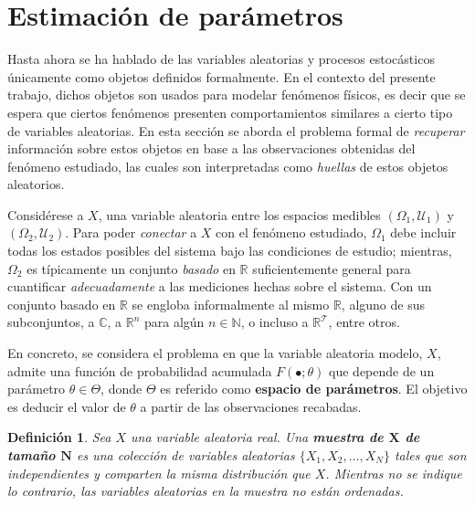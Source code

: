 \documentclass[12pt,letterpaper]{book}
\newtheorem{definicion}{Definición}[chapter]
\newcommand{\R}{\mathbb{R}}
\newcommand{\C}{\mathbb{C}}
\newcommand{\N}{\mathbb{N}}
\begin{document}

\section{Estimación de parámetros}

Hasta ahora se ha hablado de las variables aleatorias y procesos estocásticos únicamente como objetos definidos formalmente.
%
En el contexto del presente trabajo, dichos objetos son usados para modelar fenómenos físicos, es decir que se espera que ciertos fenómenos presenten comportamientos similares a cierto tipo de variables aleatorias.
%
En esta sección se aborda el problema formal de \textit{recuperar} información sobre estos objetos en base a las observaciones obtenidas del fenómeno estudiado, las cuales son interpretadas como \textit{huellas} de estos objetos aleatorios.

Considérese a $X$, una variable aleatoria entre los espacios medibles $(\Omega_1,\mathcal{U}_1)$ y $(\Omega_2,\mathcal{U}_2)$. 
%
Para poder \textit{conectar} a $X$ con el fenómeno estudiado, $\Omega_1$ debe incluir todas los estados posibles del sistema bajo las condiciones de estudio; mientras, $\Omega_2$ es típicamente un conjunto \textit{basado} en $\R$ suficientemente general para cuantificar \textit{adecuadamente} a las mediciones hechas sobre el sistema.
%
Con un conjunto basado en $\R$ se engloba informalmente al mismo $\R$, alguno de sus subconjuntos, a $\C$, a $\R^n$ para algún $n\in \N$, o incluso a $\R^\mathcal{T}$, entre otros.

En concreto, se considera el problema en que la variable aleatoria modelo, $X$, admite una función de probabilidad acumulada $F(\bullet; \theta)$ que depende de un parámetro $\theta \in \Theta$, donde $\Theta$ es referido como \textbf{espacio de parámetros}.
%
El objetivo es deducir el valor de $\theta$ a partir de las observaciones recabadas.

\begin{definicion}
Sea $X$ una variable aleatoria real. Una \textbf{muestra de $\boldsymbol{X}$ de tamaño $\boldsymbol{N}$} es una colección de variables aleatorias $\{ X_1, X_2, \dots, X_N \}$ tales que son independientes y comparten la misma distribución que $X$.
%
Mientras no se indique lo contrario, las variables aleatorias en la muestra no están ordenadas.
\end{definicion}
\end{document}
